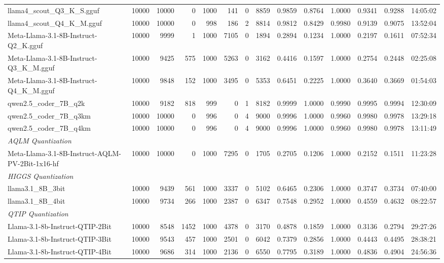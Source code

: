\begin{table}[htbp]
{\begin{tabular}{lrrrrrrrrrrrrr}
    llama4\_scout\_Q3\_K\_S.gguf & 10000 & 10000 & 0 & 1000 & 141 & 0 & 8859 & 0.9859 & 0.8764 & 1.0000 & 0.9341 & 0.9288 & 14:05:02 \\
    llama4\_scout\_Q4\_K\_M.gguf & 10000 & 10000 & 0 & 998 & 186 & 2 & 8814 & 0.9812 & 0.8429 & 0.9980 & 0.9139 & 0.9075 & 13:52:04 \\
    Meta-Llama-3.1-8B-Instruct-Q2\_K.gguf & 10000 & 9999 & 1 & 1000 & 7105 & 0 & 1894 & 0.2894 & 0.1234 & 1.0000 & 0.2197 & 0.1611 & 07:52:34 \\
    Meta-Llama-3.1-8B-Instruct-Q3\_K\_M.gguf & 10000 & 9425 & 575 & 1000 & 5263 & 0 & 3162 & 0.4416 & 0.1597 & 1.0000 & 0.2754 & 0.2448 & 02:25:08 \\
    Meta-Llama-3.1-8B-Instruct-Q4\_K\_M.gguf & 10000 & 9848 & 152 & 1000 & 3495 & 0 & 5353 & 0.6451 & 0.2225 & 1.0000 & 0.3640 & 0.3669 & 01:54:03 \\
    qwen2.5\_coder\_7B\_q2k & 10000 & 9182 & 818 & 999 & 0 & 1 & 8182 & 0.9999 & 1.0000 & 0.9990 & 0.9995 & 0.9994 & 12:30:09 \\
    qwen2.5\_coder\_7B\_q3km & 10000 & 10000 & 0 & 996 & 0 & 4 & 9000 & 0.9996 & 1.0000 & 0.9960 & 0.9980 & 0.9978 & 13:29:18 \\
    qwen2.5\_coder\_7B\_q4km & 10000 & 10000 & 0 & 996 & 0 & 4 & 9000 & 0.9996 & 1.0000 & 0.9960 & 0.9980 & 0.9978 & 13:11:49 \\
    \midrule
    \multicolumn{14}{l}{\textit{AQLM Quantization}} \\
    \midrule
    Meta-Llama-3.1-8B-Instruct-AQLM-PV-2Bit-1x16-hf & 10000 & 10000 & 0 & 1000 & 7295 & 0 & 1705 & 0.2705 & 0.1206 & 1.0000 & 0.2152 & 0.1511 & 11:23:28 \\
    \midrule
    \multicolumn{14}{l}{\textit{HIGGS Quantization}} \\
    \midrule
    llama3.1\_8B\_3bit & 10000 & 9439 & 561 & 1000 & 3337 & 0 & 5102 & 0.6465 & 0.2306 & 1.0000 & 0.3747 & 0.3734 & 07:40:00 \\
    llama3.1\_8B\_4bit & 10000 & 9734 & 266 & 1000 & 2387 & 0 & 6347 & 0.7548 & 0.2952 & 1.0000 & 0.4559 & 0.4632 & 08:22:57 \\
    \midrule
    \multicolumn{14}{l}{\textit{QTIP Quantization}} \\
    \midrule
    Llama-3.1-8b-Instruct-QTIP-2Bit & 10000 & 8548 & 1452 & 1000 & 4378 & 0 & 3170 & 0.4878 & 0.1859 & 1.0000 & 0.3136 & 0.2794 & 29:27:26 \\
    Llama-3.1-8b-Instruct-QTIP-3Bit & 10000 & 9543 & 457 & 1000 & 2501 & 0 & 6042 & 0.7379 & 0.2856 & 1.0000 & 0.4443 & 0.4495 & 28:38:21 \\
    Llama-3.1-8b-Instruct-QTIP-4Bit & 10000 & 9686 & 314 & 1000 & 2136 & 0 & 6550 & 0.7795 & 0.3189 & 1.0000 & 0.4836 & 0.4904 & 24:56:36 \\
    \bottomrule
  \end{tabular}
  }
\end{table}

